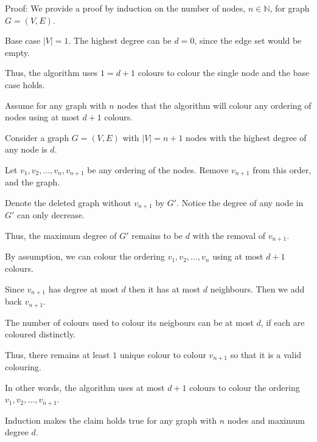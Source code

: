 \begin{soln}
	Proof: We provide a proof by induction on the number of nodes, \(n \in \mathbb{N}\), for graph \(G = (V, E)\).

	Base case \(|V| = 1\). The highest degree can be \(d = 0\), since the edge set would be empty.

	Thus, the algorithm uses \(1 = d + 1\) colours to colour the single node and the base case holds.

	Assume for any graph with \(n\) nodes that the algorithm will colour any ordering of nodes using at most \(d + 1\) colours.

	Consider a graph \(G = (V, E)\) with \(|V| = n + 1\) nodes with the highest degree of any node is \(d\).

	Let \(v_1, v_2, \dots, v_n, v_{n+1}\) be any ordering of the nodes. Remove \(v_{n+1}\) from this order, and the graph.

	Denote the deleted graph without \(v_{n+1}\) by \(G'\). Notice the degree of any node in \(G'\) can only decrease.

	Thus, the maximum degree of \(G'\) remains to be \(d\) with the removal of \(v_{n+1}\).

	By assumption, we can colour the ordering \(v_1, v_2, \dots, v_n\) using at most \(d+1\) colours.

	Since \(v_{n+1}\) has degree at most \(d\) then it has at most \(d\) neighbours. Then we add back \(v_{n+1}\).

	The number of colours used to colour its neigbours can be at most \(d\), if each are coloured distinctly.

	Thus, there remains at least \(1\) unique colour to colour \(v_{n+1}\) so that it is a valid colouring.

	In other words, the algorithm uses at most \(d + 1\) colours to colour the ordering \(v_1, v_2, \dots, v_{n+1}\).

	Induction makes the claim holds true for any graph with \(n\) nodes and maximum degree \(d\).


\end{soln}
